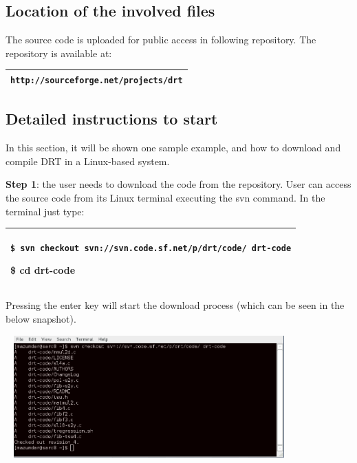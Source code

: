 \documentclass[a4paper]{article}
\begin{document}
\subsection[Location of the involved files ]{Location of the involved
files }
{
The source code is uploaded for public access in following repository.
The repository is available at:}

\begin{flushleft}
\tablehead{}
\begin{supertabular}{|m{6.29346in}|}
\hline
{}
\texttt{http://sourceforge.net/projects/drt}\\\hline
\end{supertabular}
\end{flushleft}
\subsection[Detailed instructions to start \ ]{Detailed instructions to
start \foreignlanguage{english}{\ }}
{
{In this section, it
will be shown one sample example, and how to download and compile DRT
in a Linux-based system. }}

{
\textbf{{Step
1}}{: the user needs
to download the code from the repository. User can access the source
code from its Linux terminal executing the svn command. In the terminal
just type:}}

\begin{flushleft}
\tablehead{}
\begin{supertabular}{|m{6.29346in}|}
\hline
{ \texttt{\$ svn checkout
svn://svn.code.sf.net/p/drt/code/ drt-code}}

\ttfamily \$ cd drt-code\\\hline
\end{supertabular}
\end{flushleft}
{
Pressing the enter key will start the download process (which can be
seen in the below snapshot).}

{\centering 
\includegraphics[width=4.3425in,height=1.8472in]{img61.png}
\par}
\end{document}
